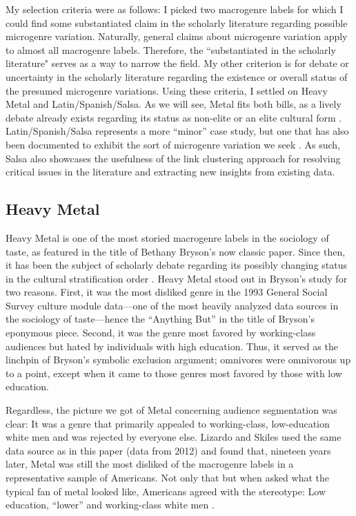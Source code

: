 \documentclass[a4paper,12pt]{article}
\begin{document}
My selection criteria were as follows: I picked two macrogenre labels for which I could find some substantiated claim in the scholarly literature regarding possible microgenre variation. Naturally, general claims about microgenre variation apply to almost all macrogenre labels. Therefore, the ``substantiated in the scholarly literature" serves as a way to narrow the field. My other criterion is for debate or uncertainty in the scholarly literature regarding the existence or overall status of the presumed microgenre variations. Using these criteria, I settled on Heavy Metal and Latin/Spanish/Salsa. As we will see, Metal fits both bills, as a lively debate already exists regarding its status as non-elite or an elite cultural form \citep{tampubolon2008revisiting}. Latin/Spanish/Salsa represents a more ``minor'' case study, but one that has also been documented to exhibit the sort of microgenre variation we seek \citep{Bachmayer2014-pk}. As such, Salsa also showcases the usefulness of the link clustering approach for resolving critical issues in the literature and extracting new insights from existing data.

\subsection{Heavy Metal}
Heavy Metal is one of the most storied macrogenre labels in the sociology of taste, as featured in the title of Bethany Bryson's \citeyearpar{bryson96} now classic paper. Since then, it has been the subject of scholarly debate regarding its possibly changing status in the cultural stratification order \citep{tampubolon2008revisiting, goldberg2011mapping, lizardo_skiles15}. Heavy Metal stood out in Bryson's study for two reasons. First, it was the most disliked genre in the 1993 General Social Survey culture module data---one of the most heavily analyzed data sources in the sociology of taste---hence the ``Anything But'' in the title of Bryson's eponymous piece. Second, it was the genre most favored by working-class audiences but hated by individuals with high education. Thus, it served as the linchpin of Bryson's symbolic exclusion argument; omnivores were omnivorous up to a point, except when it came to those genres most favored by those with low education. 

Regardless, the picture we got of Metal concerning audience segmentation was clear: It was a genre that primarily appealed to working-class, low-education white men and was rejected by everyone else. Lizardo and Skiles \citeyearpar[][6, table 2]{lizardo_skiles16} used the same data source as in this paper (data from 2012) and found that, nineteen years later, Metal was still the most disliked of the macrogenre labels in a representative sample of Americans. Not only that but when asked what the typical fan of metal looked like, Americans agreed with the stereotype: Low education, ``lower'' and working-class white men \citep[][7, table 3]{lizardo_skiles16}. 
\end{document}
